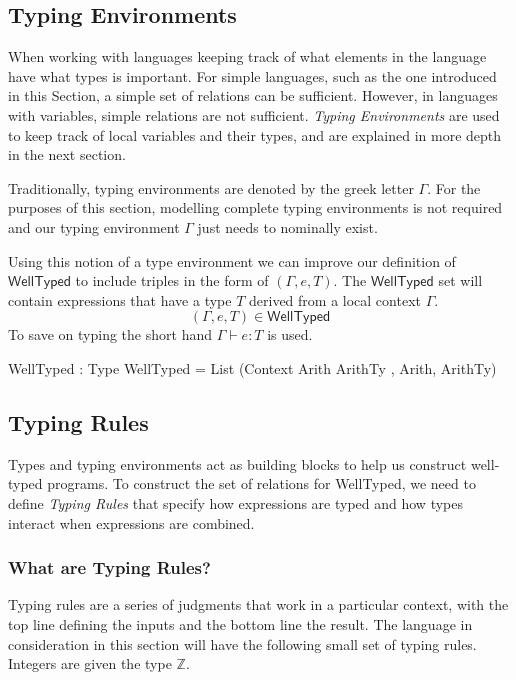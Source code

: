 \subsection{Typing Environments}
\label{sec:typed-arith:type-env}

When working with languages keeping track of what elements in the language have what types is important.
For simple languages, such as the one introduced in this Section, a simple set of relations can be sufficient.
However, in languages with variables, simple relations are not sufficient.
\emph{Typing Environments} are used to keep track of local variables and their types, and are explained in more depth in the next section.

Traditionally, typing environments are denoted by the greek letter $\Gamma$.
For the purposes of this section, modelling complete typing environments is not required and our typing environment $\Gamma$ just needs to nominally exist.

Using this notion of a type environment we can improve our definition of $\mathsf{WellTyped}$ to include triples in the form of $(\Gamma,e,T)$.
The $\mathsf{WellTyped}$ set will contain expressions that have a type $T$ derived from a local context $\Gamma$.
\[
(\Gamma,e,T)\in\mathsf{WellTyped}
\]
\noindent
To save on typing the short hand $\Gamma\vdash e:T$ is used.

\begin{code}
WellTyped : Type
WellTyped = List (Context Arith ArithTy , Arith, ArithTy)
\end{code}

\subsection{Typing Rules}
\label{sec:typed-arith:rules}

Types and typing environments act as building blocks to help us construct well-typed programs.
To construct the set of relations for \textsf{WellTyped}, we need to define \emph{Typing Rules} that specify how expressions are typed and how types interact when expressions are combined.

\subsubsection{What are Typing Rules?}
\label{sec:typed-arith:rules:what}

Typing rules are a series of judgments that work in a particular context, with the top line defining the inputs and the bottom line the result.
The language in consideration in this section will have the following small set of typing rules.
Integers are given the type $\mathbb{Z}$.

